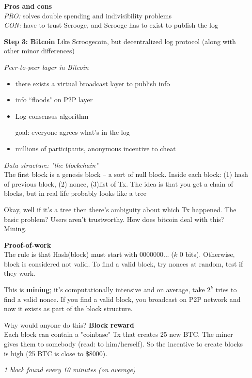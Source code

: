 \textbf{Pros and cons}\\
\textit{PRO:} solves double spending and indivisibility problems\\
\textit{CON:} have to trust Scrooge, and Scrooge has to exist to publish the log

\textbf{Step 3: Bitcoin}
Like Scroogecoin, but decentralized log protocol (along with other minor differences)

\textit{Peer-to-peer layer in Bitcoin}
\begin{itemize}
	\item there exists a virtual broadcast layer to publish info
	\item info ``floods" on P2P layer
	\item Log consensus algorithm
		
		goal: everyone agrees what's in the log
	\item millions of participants, anonymous incentive to cheat
\end{itemize}

	
\textit{Data structure: "the blockchain"}\\
The first block is a genesis block -- a sort of null block.
Inside each block: (1) hash of previous block, (2) nonce, (3)list of Tx. The idea is that you get a chain of blocks, but in real life probably looks like a tree

Okay, well if it's a tree then there's ambiguity about which Tx happened. The basic problem? Users aren't trustworthy. How does bitcoin deal with this? Mining.

\textbf{Proof-of-work}\\
The rule is that Hash(block) must start with 0000000... ($k$ 0 bits). Otherwise, block is considered not valid. To find a valid block, try nonces at random, test if they work.

This is \textbf{mining}; it's computationally intensive and on average, take $2^k$ tries to find a valid nonce. If you find a valid block, you broadcast on P2P network and now it exists as part of the block structure.
	
Why would anyone do this?
\textbf{Block reward}\\
Each block can contain a "coinbase" Tx that creates 25 new BTC. The miner gives them to somebody (read: to him/herself). So the incentive to create blocks is high (25 BTC is close to \$8000). 

\textit{1 block found every 10 minutes (on average)}

